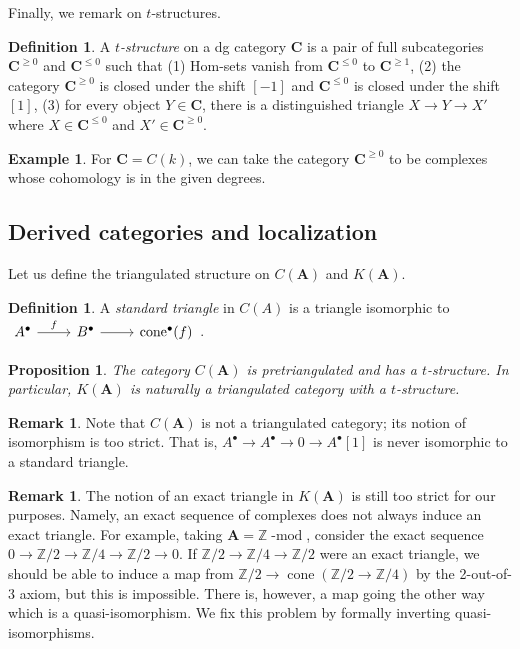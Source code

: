 \documentclass[10pt]{article}
\newtheorem{prop}[thm]{Proposition}
\theoremstyle{definition}
\newtheorem{exmp}[thm]{Example}
\newtheorem{defn}[thm]{Definition}
\newtheorem{rmk}[thm]{Remark}
\DeclareMathOperator{\dmod}{-mod}
\DeclareMathOperator{\cone}{cone}
\newcommand{\cat}{\mathbf}
\newcommand{\Z}{\mathbb{Z}}
\begin{document}
Finally, we remark on $t$-structures.
\begin{defn}
A \emph{$t$-structure} on a dg category $\cat{C}$ is a pair of full subcategories $\cat{C}^{\geq 0}$ and $\cat{C}^{\leq 0}$ such that (1) Hom-sets vanish from $\cat{C}^{\leq 0}$ to $\cat{C}^{\geq 1}$, (2) the category $\cat{C}^{\geq 0}$ is closed under the shift $[-1]$ and $\cat{C}^{\leq 0}$ is closed under the shift $[1]$, (3) for every object $Y \in \cat{C}$, there is a distinguished triangle $X \rightarrow Y \rightarrow X'$ where $X \in \cat{C}^{\leq 0}$ and $X' \in \cat{C}^{\geq 0}$.
\end{defn}

\begin{exmp}
For $\cat{C} = C(k)$, we can take the category $\cat{C}^{\geq 0}$ to be complexes whose cohomology is in the given degrees. 
\end{exmp}


\subsection{Derived categories and localization}



Let us define the triangulated structure on $C(\cat{A})$ and $K(\cat{A})$.
\begin{defn}
A \emph{standard triangle} in $C(A)$ is a triangle isomorphic to $\begin{tikzcd} A^\bullet \arrow[r, "f"] & B^\bullet \arrow[r] & \cone^\bullet(f)\end{tikzcd}$.
\end{defn}



\begin{prop}
The category $C(\cat{A})$ is pretriangulated and has a $t$-structure.  In particular, $K(\cat{A})$ is naturally a triangulated category with a $t$-structure.
\end{prop}

\begin{rmk}
Note that $C(\cat{A})$ is not a triangulated category; its notion of isomorphism is too strict.  That is, $A^\bullet \rightarrow A^\bullet \rightarrow 0 \rightarrow A^\bullet[1]$ is never isomorphic to a standard triangle.
\end{rmk}

\begin{rmk}
The notion of an exact triangle in $K(\cat{A})$ is still too strict for our purposes.  Namely, an exact sequence of complexes does not always induce an exact triangle.  For example, taking $\cat{A} = \Z\dmod$, consider the exact sequence $0 \rightarrow \Z/2 \rightarrow \Z/4 \rightarrow \Z/2 \rightarrow 0$.  If $\Z/2 \rightarrow \Z/4 \rightarrow \Z/2$ were an exact triangle, we should be able to induce a map from $\Z/2 \rightarrow \cone(\Z/2 \rightarrow \Z/4)$ by the 2-out-of-3 axiom, but this is impossible.  There is, however, a map going the other way which is a quasi-isomorphism.  We fix this problem by formally inverting quasi-isomorphisms.
\end{rmk}
\end{document}
